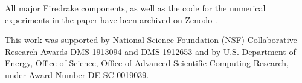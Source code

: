 \documentclass[format=acmsmall,screen,timestamp=false,a4paper]{acmart}
\begin{document}
All major Firedrake components, as well as the code for the numerical experiments in the paper have been archived on Zenodo \citep{zenodo/Firedrake-20210419.2}. 

\begin{acks}
This work was supported by National Science Foundation (NSF) Collaborative Research Awards DMS-1913094 and DMS-1912653 and by U.S. Department of Energy, Office of Science, Office of Advanced Scientific Computing Research, under Award Number DE-SC-0019039. 
\end{acks}



\end{document}
